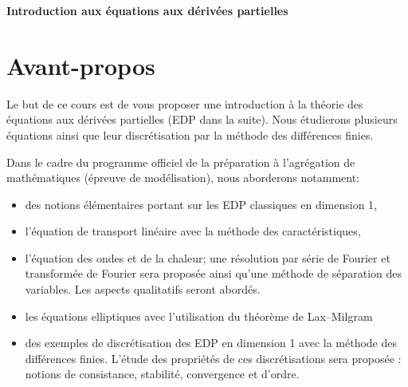 \documentclass[12pt,a4paper,twoside]{article}
\begin{document}

\newcommand{\Ni}[1]{{\left\|#1\right\|}_\infty}

% 

\begin{center}
{\bf \Huge Introduction aux \'equations aux d\'eriv\'ees partielles}
\end{center}



\section*{Avant-propos}

Le but de ce cours est de vous proposer une introduction \`a la th\'eorie
des \'equations aux d\'eriv\'ees partielles (EDP dans la suite).
Nous \'etudierons plusieurs \'equations ainsi que leur discr\'etisation
par la m\'ethode des diff\'erences finies.

Dans le cadre du programme officiel de la pr\'eparation \`a l'agr\'egation
de math\'ematiques (\'epreuve de mod\'elisation), nous aborderons notamment:
\begin{itemize}
\item des notions \'el\'ementaires portant sur les EDP classiques en dimension 1,
\item l'\'equation de transport lin\'eaire avec la m\'ethode des caract\'eristiques,
\item l'\'equation des ondes et de la chaleur; une r\'esolution par s\'erie de Fourier
  et transform\'ee de Fourier sera propos\'ee ainsi qu'une m\'ethode de s\'eparation
  des variables.
  Les aspects qualitatifs seront abord\'es.
\item les \'equations elliptiques avec l'utilisation du th\'eor\`eme de Lax--Milgram
\item des exemples de discr\'etisation des EDP en dimension 1 avec la m\'ethode des
  diff\'erences finies. L'\'etude des propri\'et\'es de ces discr\'etisations
  sera propos\'ee : notions de consistance, stabilit\'e, convergence et d'ordre.
\end{itemize}
\end{document}
